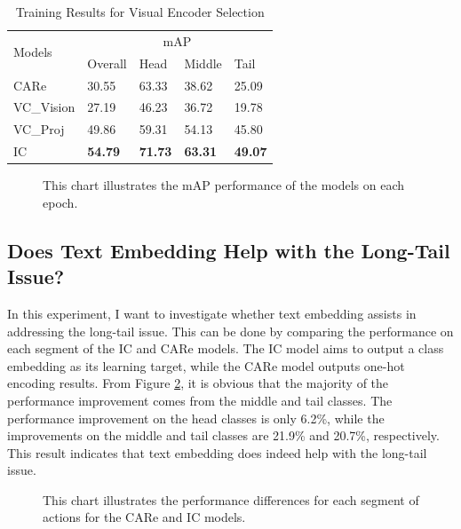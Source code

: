 \begin{table}[ht]
    \centering
    \caption{Training Results for Visual Encoder Selection}
    \label{tab:resultsbackbone}
    \begin{tabular}{lllll}
        \toprule
        \multirow{2}{*}{Models} & \multicolumn{4}{c}{mAP} \\
        \cmidrule{2-5} 
        {} & Overall & Head  & Middle & Tail \\
        \midrule
        CARe        & 30.55   & 63.33 & 38.62 & 25.09 \\
        VC\_Vision  & 27.19   & 46.23 & 36.72 & 19.78 \\
        VC\_Proj    & 49.86   & 59.31 & 54.13 & 45.80 \\
        IC          & \textbf{54.79}   & \textbf{71.73} & \textbf{63.31} & \textbf{49.07} \\
        \bottomrule
    \end{tabular}
\end{table}

\begin{figure}[ht]
    \centering
    \resizebox{1.0\textwidth}{!}{}
    \caption[mAP performance on each epoch for VC\_Vision, VC\_Proj, and IC]{This chart illustrates the mAP performance of the models on each epoch.}
    \label{fig:tp_backbone}
\end{figure}

\subsection{Does Text Embedding Help with the Long-Tail Issue?}
In this experiment, I want to investigate whether text embedding assists in addressing the long-tail issue. This can be done by comparing the performance on each segment of the IC and CARe models. The IC model aims to output a class embedding as its learning target, while the CARe model outputs one-hot encoding results. From Figure \ref{fig:tp_longtailcomp}, it is obvious that the majority of the performance improvement comes from the middle and tail classes. The performance improvement on the head classes is only 6.2\%, while the improvements on the middle and tail classes are 21.9\% and 20.7\%, respectively. This result indicates that text embedding does indeed help with the long-tail issue. 

\begin{figure}[ht]
    \centering
    \resizebox{1.0\textwidth}{!}{}
    \caption[mAP performance on the best epoch for CARe and IC]{This chart illustrates the performance differences for each segment of actions for the CARe and IC models.}
    \label{fig:tp_longtailcomp}
\end{figure}

